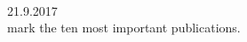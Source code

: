 \documentclass[12pt,a4]{report}
\begin{document}
\newcommand{\emp}[1]
{\it{#1}\rm}

\newenvironment{Body} %
 {\begin{list}{}{%
	\vspace{-0.6cm}
	\setlength{\leftmargin}{1.2cm}}
	  \item[]\ignorespaces}
 {\end{list}}


\vspace{-2cm}


 \\

 \hfill 21.9.2017\\


%
 mark the ten most important publications.
\vspace{0.3cm}


%

\vspace{0.3cm}





\vspace{0.4cm}

\end{document}
